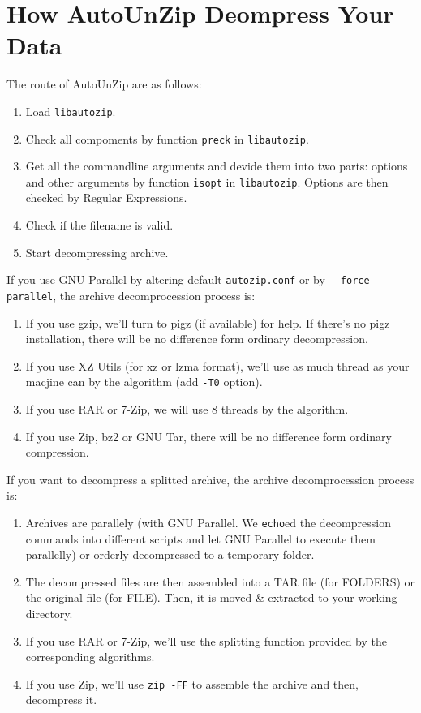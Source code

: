 \documentclass[journal,twocolumn]{IEEEtran}
\begin{document}
\section{How AutoUnZip Deompress Your Data}
The route of AutoUnZip are as follows:
\begin{enumerate}
\item Load \verb|libautozip|.
\item Check all compoments by function \verb|preck| in \verb|libautozip|.
\item Get all the commandline arguments and devide them into two parts: options and other arguments by function \verb|isopt| in \verb|libautozip|. Options are then checked by Regular Expressions.
\item Check if the filename is valid.
\item Start decompressing archive.
\end{enumerate}
If you use GNU Parallel by altering default \verb|autozip.conf| or by \verb|--force-parallel|, the archive decomprocession process is:
\begin{enumerate}
\item If you use gzip, we'll turn to pigz (if available) for help. If there's no pigz installation, there will be no difference form ordinary decompression.
\item If you use XZ Utils (for xz or lzma format), we'll use as much thread as your macjine can by the algorithm (add \verb|-T0| option).
\item If you use RAR or 7-Zip, we will use 8 threads by the algorithm.
\item If you use Zip, bz2 or GNU Tar, there will be no difference form ordinary compression.
\end{enumerate}
If you want to decompress a splitted archive, the archive decomprocession process is:
\begin{enumerate}
\item Archives are parallely (with GNU Parallel. We \verb|echo|ed the decompression commands into different scripts and let GNU Parallel to execute them parallelly) or orderly decompressed to a temporary folder.
\item The decompressed files are then assembled into a TAR file (for FOLDERS) or the original file (for FILE). Then, it is moved \& extracted to your working directory.
\item If you use RAR or 7-Zip, we'll use the splitting function provided by the corresponding algorithms.
\item If you use Zip, we'll use \verb|zip -FF| to assemble the archive and then, decompress it.
\end{enumerate}
\end{document}
